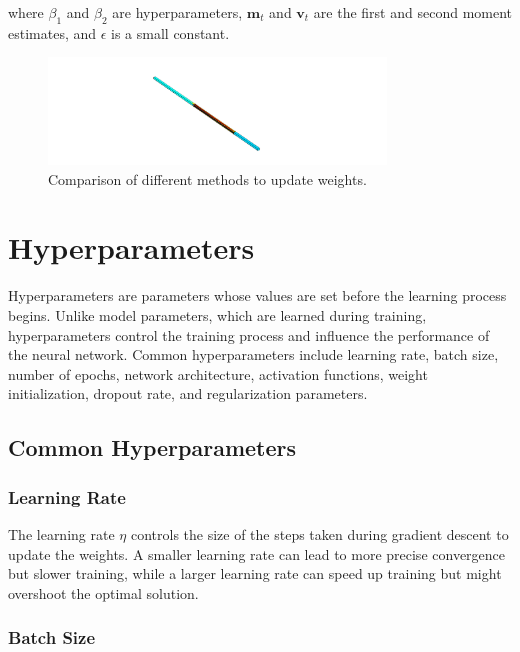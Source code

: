 \documentclass{report}
\begin{document}
            where \( \beta_1 \) and \( \beta_2 \) are hyperparameters, \( \mathbf{m}_t \) and \( \mathbf{v}_t \) are the first and second moment estimates, and \( \epsilon \) is a small constant.
            
            \begin{figure}[h]
                \centering
                \includegraphics[width=0.8\textwidth]{00_Images/00_Velocity.png}
                \caption{Comparison of different methods to update weights.}
                \label{fig:update_methods}
            \end{figure}

    \section{Hyperparameters}

        Hyperparameters are parameters whose values are set before the learning process begins. Unlike model parameters, which are learned during training, hyperparameters control the training process and influence the performance of the neural network. Common hyperparameters include learning rate, batch size, number of epochs, network architecture, activation functions, weight initialization, dropout rate, and regularization parameters.
        
        \subsection{Common Hyperparameters}
        
        \subsubsection{Learning Rate}
        
        The learning rate \( \eta \) controls the size of the steps taken during gradient descent to update the weights. A smaller learning rate can lead to more precise convergence but slower training, while a larger learning rate can speed up training but might overshoot the optimal solution.
        
        \subsubsection{Batch Size}
        
\end{document}
